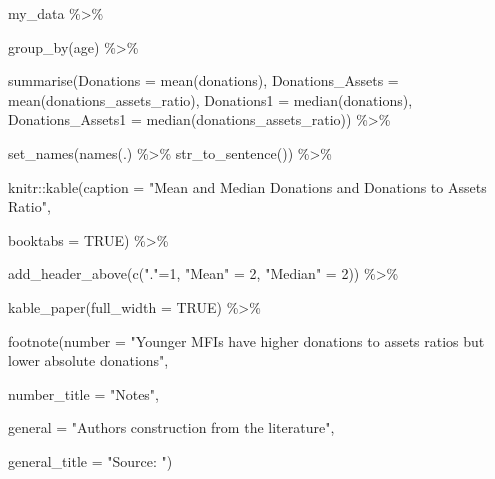 \documentclass[a4paper,nobind]{templates/ociamthesis}
\newenvironment{Shaded}{\begin{snugshade}}{\end{snugshade}}
\newcommand{\AttributeTok}[1]{\textcolor[rgb]{0.77,0.63,0.00}{#1}}
\newcommand{\ConstantTok}[1]{\textcolor[rgb]{0.00,0.00,0.00}{#1}}
\newcommand{\DecValTok}[1]{\textcolor[rgb]{0.00,0.00,0.81}{#1}}
\newcommand{\FunctionTok}[1]{\textcolor[rgb]{0.00,0.00,0.00}{#1}}
\newcommand{\NormalTok}[1]{#1}
\newcommand{\OtherTok}[1]{\textcolor[rgb]{0.56,0.35,0.01}{#1}}
\newcommand{\SpecialCharTok}[1]{\textcolor[rgb]{0.00,0.00,0.00}{#1}}
\newcommand{\StringTok}[1]{\textcolor[rgb]{0.31,0.60,0.02}{#1}}
\renewenvironment{Shaded}
{
  \vspace{10pt}%
  \begin{snugshade}%
}{%
  \end{snugshade}%
  \vspace{8pt}%
}
\begin{document}
\begin{Shaded}
\begin{Highlighting}[]
\NormalTok{my\_data }\SpecialCharTok{\%\textgreater{}\%} 
  
  \FunctionTok{group\_by}\NormalTok{(age) }\SpecialCharTok{\%\textgreater{}\%} 
  
  \FunctionTok{summarise}\NormalTok{(}\AttributeTok{Donations =} \FunctionTok{mean}\NormalTok{(donations),}
            \AttributeTok{Donations\_Assets =} \FunctionTok{mean}\NormalTok{(donations\_assets\_ratio), }
            \AttributeTok{Donations1 =} \FunctionTok{median}\NormalTok{(donations),}
            \AttributeTok{Donations\_Assets1 =} \FunctionTok{median}\NormalTok{(donations\_assets\_ratio)) }\SpecialCharTok{\%\textgreater{}\%} 
  
  \FunctionTok{set\_names}\NormalTok{(}\FunctionTok{names}\NormalTok{(.) }\SpecialCharTok{\%\textgreater{}\%} \FunctionTok{str\_to\_sentence}\NormalTok{()) }\SpecialCharTok{\%\textgreater{}\%} 
  
\NormalTok{  knitr}\SpecialCharTok{::}\FunctionTok{kable}\NormalTok{(}\AttributeTok{caption =} \StringTok{"Mean and Median Donations and Donations to Assets Ratio"}\NormalTok{, }
               
               \AttributeTok{booktabs =} \ConstantTok{TRUE}\NormalTok{) }\SpecialCharTok{\%\textgreater{}\%} 
  
  \FunctionTok{add\_header\_above}\NormalTok{(}\FunctionTok{c}\NormalTok{(}\StringTok{"."}\OtherTok{=}\DecValTok{1}\NormalTok{, }\StringTok{"Mean"} \OtherTok{=} \DecValTok{2}\NormalTok{, }\StringTok{"Median"} \OtherTok{=} \DecValTok{2}\NormalTok{)) }\SpecialCharTok{\%\textgreater{}\%} 
  
  \FunctionTok{kable\_paper}\NormalTok{(}\AttributeTok{full\_width =} \ConstantTok{TRUE}\NormalTok{) }\SpecialCharTok{\%\textgreater{}\%} 
  
  \FunctionTok{footnote}\NormalTok{(}\AttributeTok{number =} \StringTok{"Younger MFIs have higher donations to assets ratios but lower absolute donations"}\NormalTok{, }
           
           \AttributeTok{number\_title =} \StringTok{"Notes"}\NormalTok{,}
    
           \AttributeTok{general =} \StringTok{"Authors\textquotesingle{} construction from the literature"}\NormalTok{,}
           
           \AttributeTok{general\_title =} \StringTok{"Source: "}\NormalTok{) }
\end{Highlighting}
\end{Shaded}
\end{document}
